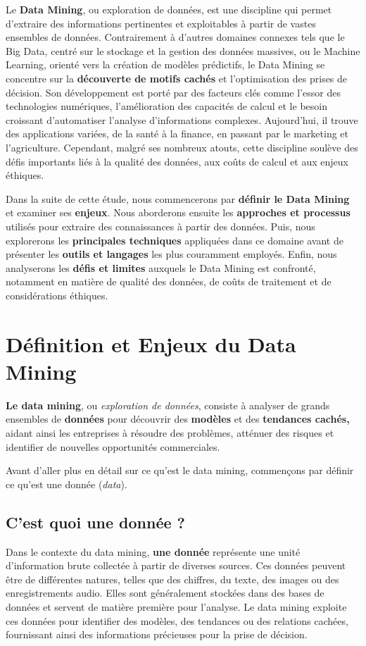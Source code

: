 \documentclass[a4paper,14pt]{article}
\begin{document}
     Le \textbf{Data Mining}, ou exploration de données, est une discipline qui permet d’extraire des informations pertinentes et exploitables à partir de vastes ensembles de données. Contrairement à d’autres domaines connexes tels que le Big Data, centré sur le stockage et la gestion des données massives, ou le Machine Learning, orienté vers la création de modèles prédictifs, le Data Mining se concentre sur la \textbf{découverte de motifs cachés} et l’optimisation des prises de décision. Son développement est porté par des facteurs clés comme l’essor des technologies numériques, l’amélioration des capacités de calcul et le besoin croissant d’automatiser l’analyse d’informations complexes. Aujourd’hui, il trouve des applications variées, de la santé à la finance, en passant par le marketing et l’agriculture. Cependant, malgré ses nombreux atouts, cette discipline soulève des défis importants liés à la qualité des données, aux coûts de calcul et aux enjeux éthiques.

     Dans la suite de cette étude, nous commencerons par \textbf{définir le Data Mining} et examiner ses \textbf{enjeux}. Nous aborderons ensuite les \textbf{approches et processus} utilisés pour extraire des connaissances à partir des données. Puis, nous explorerons les \textbf{principales techniques }appliquées dans ce domaine avant de présenter les \textbf{outils et langages} les plus couramment employés. Enfin, nous analyserons les \textbf{défis et limites} auxquels le Data Mining est confronté, notamment en matière de qualité des données, de coûts de traitement et de considérations éthiques.
\newpage

\section{Définition et Enjeux du Data Mining}
\textbf{Le data mining}, ou \textit{exploration de données}, consiste à analyser de grands ensembles de \textbf{données} pour découvrir des \textbf{modèles} et des \textbf{tendances cachés,} aidant ainsi les entreprises à résoudre des problèmes, atténuer des risques et identifier de nouvelles opportunités commerciales.

Avant d’aller plus en détail sur ce qu’est le data mining, commençons par définir ce qu’est une donnée (\textit{data}). \\


    \subsection{C'est quoi une donnée ?}
        Dans le contexte du data mining, \textbf{une donnée} représente une unité d'information brute collectée à partir de diverses sources. Ces données peuvent être de différentes natures, telles que des chiffres, du texte, des images ou des enregistrements audio. Elles sont généralement stockées dans des bases de données et servent de matière première pour l'analyse. Le data mining exploite ces données pour identifier des modèles, des tendances ou des relations cachées, fournissant ainsi des informations précieuses pour la prise de décision.\\
\end{document}
